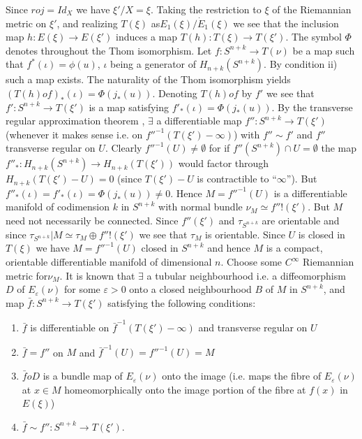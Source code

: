    Since $roj = Id_X$ we have $\xi' / X=\xi$. Taking the restriction
   to $\xi$ of the Riemannian metric on $\xi'$, and realizing $T(\xi)$
   as\pageoriginale $E_1 (\xi) / \dot{E}_1 (\xi)$ we see that the
   inclusion map $h : 
   E (\xi) \to E (\xi')$ induces a map $T(h) : T (\xi) \to T
   (\xi')$. The symbol $\Phi$ denotes throughout the Thom
   isomorphism. Let  $f : S^{n+k} \to T(\nu)$ be a map such that
   $f^*(\iota) = \phi (u)$, $\iota$  being a generator of $H_{n+k}
   (S^{n+k})$. By condition ii) such a map exists. The naturality of
   the Thom isomorphism yields $(T(h) of)_* (\iota) = \Phi (j_*
   (u))$. Denoting $T(h) o f$ by $f'$ we see that $f' : S^{n+k} \to T
   (\xi')$ is a map satisfying $f'_* (\iota) = \Phi (j_*(u))$. By the
   transverse regular approximation theorem \cite{c1:key4}, $\exists$ a
   differentiable map $f'' : S^{n+k}\to T(\xi')$ (whenever it makes
   sense i.e. on $f''^{-1}(T(\xi') - \infty)$) with $f'' \sim f'$ and
   $f''$ transverse regular on $U$. Clearly $f''^{-1} (U) \neq \emptyset$
   for if $f''(S^{n+k}) \cap U = \emptyset$ the map $f''_* : H_{n+k}
   (S^{n+k}) \to H_{n+k} (T (\xi'))$ would factor through $H_{n+k} (T (\xi') -
   U)=0$ (since $T (\xi')-U$ is contractible to ``$\infty$''). But
   $f''_* (\iota) = f'_*(\iota) = \Phi (j_* (u)) \neq 0$. Hence
   $M=f''^{-1}(U)$ is a differentiable manifold of codimension $k$
   in $S^{n+k}$ with normal bundle $\nu _M \simeq f'' ! (\xi')$. But $M$
   need not necessarily be connected. Since $f''(\xi')$ and
   $\tau_{S^{n+k}}$ are orientable and since $\tau_{S^{n+k}} \Big| M\simeq
   \tau_M \oplus f'' ! (\xi')$ we see that $\tau_M$ is
   orientable. Since $U$ is closed in $T(\xi)$ we have $M = f''^{-1}
   (U)$ closed in $S^{n+k}$ and hence $M$ is a compact, orientable
   differentiable manifold of dimensional $n$. Choose some $C^\infty$
   Riemannian  metric for\pageoriginale $\nu_M$. It is known that
   $\exists$ a tubular neighbourhood i.e. a diffeomorphism $D$ of
   $E_\varepsilon (\nu)$ for some $\varepsilon>0$ onto a closed neighbourhood $B$
   of $M$ in $S^{n+k}$, and map $\bar{f}: S^{n+k} \to T(\xi')$ satisfying
   the following conditions: 
\begin{enumerate}[1)]
\item $\bar{f}$ is differentiable on $\bar{f}^{-1}(T(\xi')-\infty)$ and
  transverse regular on $U$ 

\item $\bar{f}=f''$ on $M$ and $\bar{f}^{-1}(U)=f''^{-1}(U)=M$ 

\item $\bar{f} o D$ is a bundle map of $E_\varepsilon (\nu)$ onto the
  image (i.e. maps the fibre of $E_\varepsilon (\nu)$ at $x \in M$
  homeomorphically onto the image portion of the fibre at $f(x)$ in
  $E(\xi)$) 

\item $\bar{f}\sim f'' : S^{n+k}\to T (\xi')$. 
 \end{enumerate} 
     

